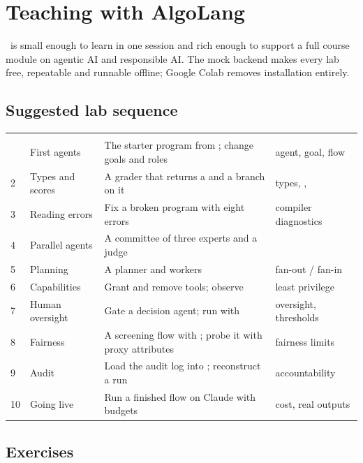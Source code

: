 \chapter{Teaching with AlgoLang}
\label{ch:teaching}

\algolang\ is small enough to learn in one session and rich enough to support a full course module on agentic AI and responsible AI. The mock backend makes every lab free, repeatable and runnable offline; Google Colab removes installation entirely.

\section{Suggested lab sequence}

\begin{center}
\small
\begin{tabularx}{\linewidth}{@{}L{0.7cm}L{3.6cm}YL{2.4cm}@{}}
\toprule
{} &  &  & \\
 & First agents & The starter program from ; change goals and roles & agent, goal, flow\\
2 & Types and scores & A grader that returns a  and a branch on it & types, , \\
3 & Reading errors & Fix a broken program with eight errors & compiler diagnostics\\
4 & Parallel agents & A committee of three experts and a judge & \\
5 & Planning & A planner and  workers & fan-out / fan-in\\
6 & Capabilities & Grant and remove tools; observe  & least privilege\\
7 & Human oversight & Gate a decision agent; run with  & oversight, thresholds\\
8 & Fairness & A screening flow with ; probe it with proxy attributes & fairness limits\\
9 & Audit & Load the audit log into ; reconstruct a run & accountability\\
10 & Going live & Run a finished flow on Claude with budgets & cost, real outputs\\
\bottomrule
\end{tabularx}
\end{center}

\section{Exercises}

